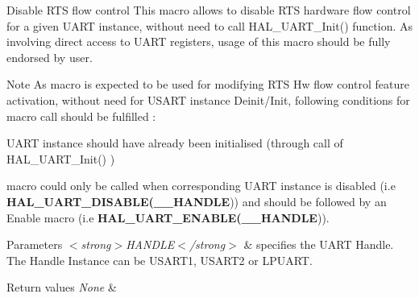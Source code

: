 Disable R\+TS flow control This macro allows to disable R\+TS hardware flow control for a given U\+A\+RT instance, without need to call H\+A\+L\+\_\+\+U\+A\+R\+T\+\_\+\+Init() function. As involving direct access to U\+A\+RT registers, usage of this macro should be fully endorsed by user. 

\begin{DoxyNote}{Note}
As macro is expected to be used for modifying R\+TS Hw flow control feature activation, without need for U\+S\+A\+RT instance Deinit/\+Init, following conditions for macro call should be fulfilled \+:
\begin{DoxyItemize}
\item U\+A\+RT instance should have already been initialised (through call of H\+A\+L\+\_\+\+U\+A\+R\+T\+\_\+\+Init() )
\item macro could only be called when corresponding U\+A\+RT instance is disabled (i.\+e {\bfseries H\+A\+L\+\_\+\+U\+A\+R\+T\+\_\+\+D\+I\+S\+A\+B\+LE(\+\_\+\+\_\+\+H\+A\+N\+D\+LE})) and should be followed by an Enable macro (i.\+e {\bfseries H\+A\+L\+\_\+\+U\+A\+R\+T\+\_\+\+E\+N\+A\+B\+LE(\+\_\+\+\_\+\+H\+A\+N\+D\+LE})). 
\end{DoxyItemize}
\end{DoxyNote}

\begin{DoxyParams}{Parameters}
{\em $<$strong$>$\+H\+A\+N\+D\+L\+E$<$/strong$>$} & specifies the U\+A\+RT Handle. The Handle Instance can be U\+S\+A\+R\+T1, U\+S\+A\+R\+T2 or L\+P\+U\+A\+RT. \\
\hline
\end{DoxyParams}

\begin{DoxyRetVals}{Return values}
{\em None} & \\
\hline
\end{DoxyRetVals}
